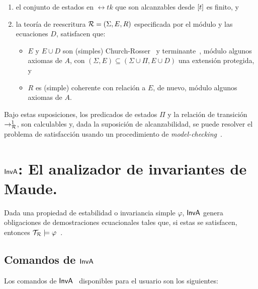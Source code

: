 \begin{enumerate}
   \item el conjunto de estados en $\rel{t}{k}$ que son alcanzables desde
	$[t]$ es finito, y

   \item la teoría de reescritura $\mathcal{R} = (\Sigma,E,R)$ especificada
	por el módulo  y las ecuaciones $D$, satisfacen que:
	\begin{itemize}
	   \item $E$ y $E \cup D$ son (simples) Church-Rosser~\cite{DBLP:journals/jlp/DuranM12}
		y terminante~\cite{Lucas2009207}, módulo algunos axiomas
		de $A$, con $(\Sigma,E) \subseteq (\Sigma \cup \Pi, E \cup D)$
		una extensión protegida, y

	   \item $R$ es (simple) coherente con relación a $E$, de nuevo,
		módulo algunos axiomas de $A$.
	\end{itemize}
\end{enumerate}

Bajo estas suposiciones, los predicados de estados $\Pi$ y la relación de 
transición $\rightarrow_{\mathcal{R}}^{1}$, son calculables y, dada la suposición de
alcanzabilidad, se puede resolver el problema de satisfacción usando un
procedimiento de {\em model-checking}~\cite{clarke-book}.

\section{${\sf InvA}$: El analizador de invariantes de Maude.}
\label{inva.prelim}

Dada una propiedad de estabilidad o invariancia simple $\varphi$, ${\sf InvA}$
genera obligaciones de demostraciones ecuacionales tales que, si estas se
satisfacen, entonces $\mathcal{T}_{\mathcal{R}} \models \varphi$~\cite{thesis-rocha}.

\subsection{Comandos de ${\sf InvA}$}
\label{ci.prelim}

Los comandos de ${\sf InvA}$~\cite{thesis-rocha} disponibles para el usuario son los siguientes:

